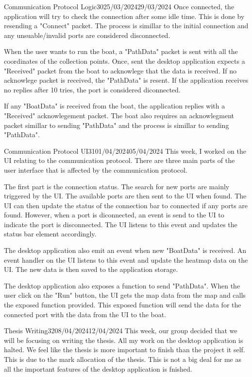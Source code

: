 \documentclass[12pt]{article}
\begin{document}
\begin{logbook-entry}{Communication Protocol Logic}{30}{25/03/2024}{29/03/2024}
Once connected, the application will try to check the connection after some idle time.
This is done by resending a "Connect" packet.
The process is simillar to the initial connection and any unsuable/invalid ports are considered disconnected.

When the user wants to run the boat, a "PathData" packet is sent with all the coordinates of the collection points.
Once, sent the desktop application expects a "Received" packet from the boat to acknowlege that the data is received.
If no acknowlege packet is received, the "PathData" is resent.
If the application receives no replies after 10 tries, the port is considered diconnected.

If any "BoatData" is received from the boat, the application replies with a "Received" acknowlegement packet.
The boat also requires an acknowlegment packet simillar to sending "PathData" and the process is simillar to sending "PathData".
\end{logbook-entry}

\begin{logbook-entry}{Communication Protocol UI}{31}{01/04/2024}{05/04/2024}
This week, I worked on the UI relating to the communication protocol.
There are three main parts of the user interface that is affected by the communication protocol.

The first part is the connection status.
The search for new ports are mainly triggered by the UI.
The available ports are then sent to the UI when found.
The UI can then update the status of the connection bar to connected if any ports are found.
However, when a port is diconnected, an event is send to the UI to indicate the port is disconnected.
The UI listens to this event and updates the status bar element accordingly.

The desktop application also emit an event when new "BoatData" is received.
An event handler on the UI listens to this event and update the heatmap data on the UI.
The new data is then saved to the application storage.

The desktop application also exposes a function to send "PathData".
When the user click on the "Run" button, the UI gets the map data from the map and calls the exposed function provided.
This exposed function will send the data for the connected port with the data from the UI to the boat.
\end{logbook-entry}

\begin{logbook-entry}{Thesis Writing}{32}{08/04/2024}{12/04/2024}
This week, our group decided that we will be focusing on writing the thesis.
All my work on the desktop application is halted.
We feel like the thesis is more important to finish than the project it self.
This is due to the mark allocation of the thesis.
This is not a big deal for me as all the important features of the desktop application is fnished.
\end{logbook-entry}
\end{document}
